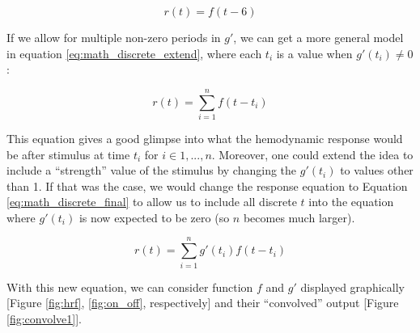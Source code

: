 \begin{equation}  \label{eq:math_discrete}
r(t)=  f(t-6)
\end{equation}



If we allow for multiple non-zero periods in $g'$, we can get a more general 
model in equation \ref{eq:math_discrete_extend}, where each $t_i$ is a value 
when $g'(t_i) \neq 0$: 

\begin{equation}  \label{eq:math_discrete_extend}
r(t)= \sum_{i=1}^n f(t-t_i)
\end{equation}

This equation gives a good glimpse into what the hemodynamic response would be 
after stimulus at time $t_i$ for $i \in {1,...,n}$. Moreover, one could extend 
the idea to include a ``strength'' value of the stimulus by changing the 
$g'(t_i)$ to values other than 1. If that was the case, we would change 
the response equation to Equation \ref{eq:math_discrete_final} to allow us to 
include all discrete $t$ into the equation where $g'(t_i)$ is now expected to 
be zero (so $n$ becomes much larger). 

\begin{equation}  \label{eq:math_discrete_final}
r(t)= \sum_{i=1}^n g'(t_i) f(t-t_i)
\end{equation}


With this new equation, we can consider function $f$ and $g'$ displayed 
graphically [Figure \ref{fig:hrf}, \ref{fig:on_off}, respectively] and 
their ``convolved'' output [Figure \ref{fig:convolve1}].




